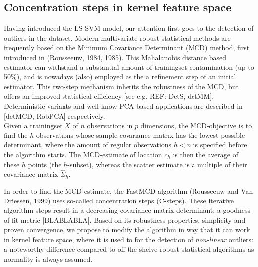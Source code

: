 \documentclass[preprint,12pt]{elsarticle}
\begin{document}
\subsection{Concentration steps in kernel feature space}

Having introduced the LS-SVM model, our attention first goes to the detection of outliers in the dataset. Modern multivariate robust statistical methods are frequently based on the Minimum Covariance Determinant (MCD) method, first introduced in  (Rousseeuw, 1984, 1985). This Mahalanobis distance based estimator can withstand a substantial amount of trainingset contamination (up to 50\%), and is nowadays (also) employed as the a refinement step of an initial estimator. This two-step mechanism inherits the robustness of the MCD, but offers an improved statistical efficiency [see e.g. REF: DetS, detMM]. Deterministic variants and well know PCA-based applications are described in [detMCD, RobPCA] respectively. \\

Given a trainingset $X$ of $n$ observations in $p$ dimensions, the MCD-objective is to find the $h$ observations whose sample covariance matrix has the lowest possible determinant, where the amount of regular observations $h < n$ is specified before the algorithm starts. The MCD-estimate of location $c_h$ is then the average of these $h$ points (the $h$-subset), whereas the scatter estimate is a multiple of their covariance matrix $\hat{\Sigma}_{h}$. 

In order to find the MCD-estimate, the FastMCD-algorithm (Rousseeuw and Van Driessen, 1999) uses so-called concentration steps (C-steps). These iterative algorithm steps result in a decreasing covariance matrix determinant: a goodness-of-fit metric [BLABLABLA]. Based on its robustness properties, simplicity and proven convergence, we propose to modify the algorithm in way that it can work in kernel feature space, where it is used to for the detection of \textit{non-linear} outliers: a noteworthy difference compared to off-the-shelve robust statistical algorithms as normality is always assumed. \\
\end{document}
